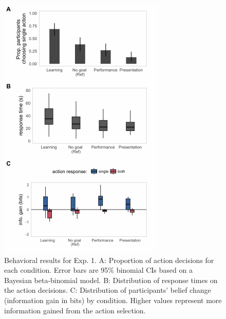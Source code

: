 \documentclass[10pt, letterpaper]{article}
\newenvironment{CodeChunk}{}{}
\begin{document}
\begin{CodeChunk}
\begin{figure}[H]

{\centering \includegraphics[width=0.94\linewidth]{figs/e1_behav_results_plot-1} 

}

\caption[Behavioral results for Exp]{Behavioral results for Exp. 1. A: Proportion of action decisions for each condition. Error bars are 95\% binomial CIs based on a Bayesian beta-binomial model. B: Distribution of response times on the action decisions. C: Distribution of participants' belief change (information gain in bits) by condition. Higher values represent more information gained from the action selection.}\label{fig:e1_behav_results_plot}
\end{figure}
\end{CodeChunk}
\end{document}
